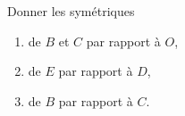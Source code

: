 
\begin{exercice}\label{exosmath-0988}

    Donner les symétriques
    \begin{enumerate}
        \item
            de \( B \) et \( C\) par rapport à \( O\),
        \item
            de \( E\) par rapport à \( D\),
        \item
            de \( B\) par rapport à \( C\).
    \end{enumerate}

\begin{center}
   
\end{center}

\end{exercice}
